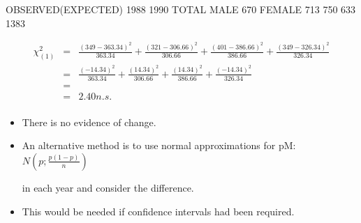 \documentclass[a4paper,12pt]{article}
\begin{document}
\begin{enumerate}
\begin{center}
{\begin{tabular}{c|c|c|c|}
\end{tabular}
}
\end{center}
OBSERVED(EXPECTED) 1988 1990 TOTAL
MALE   670
FEMALE   713
750 633 1383

\begin{eqnarray*}
\chi^2_{
(1)} &=& 
\frac{(349 - 363.34)^2}{
363.34} 
+ \frac{(321 - 306.66)^2}{
306.66} 
+   \frac{(401 - 386.66)^2}{
386.66} 
+ \frac{(349 - 
326.34)^2}{
326.34}\\
&=&  \frac{(-14.34)^2}{363.34} + \frac{(14.34)^2}{306.66} + \frac{(14.34)^2}{386.66} + \frac{(-14.34)^2}{326.34}  \\
&=&  \\
&=& 2.40n.s.\\
\end{eqnarray*}
\begin{itemize}
    \item There is no evidence of change.
\item An alternative method is to use normal approximations for pM: $N(p; \frac{p(1-p)}{n})$

in each year and consider the difference. 
\item This would be needed if confidence
intervals had been required. 
\end{itemize}

\end{enumerate}
\end{document}
